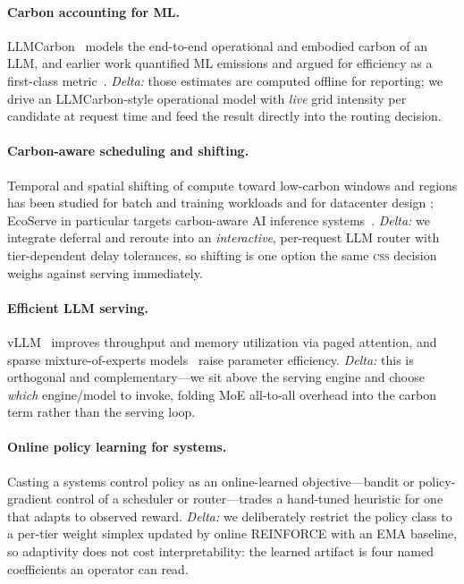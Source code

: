 \documentclass[10pt,twocolumn]{article}
\newcommand{\css}{\textsc{css}}
\begin{document}
\paragraph{Carbon accounting for ML.}
LLMCarbon~\cite{llmcarbon} models the end-to-end operational and embodied
carbon of an LLM, and earlier work quantified ML emissions and argued for
efficiency as a first-class metric~\cite{mlco2,green-ai}. \emph{Delta:} those
estimates are computed offline for reporting; we drive an LLMCarbon-style
operational model with \emph{live} grid intensity per candidate at request time
and feed the result directly into the routing decision.

\paragraph{Carbon-aware scheduling and shifting.}
Temporal and spatial shifting of compute toward low-carbon windows and regions
has been studied for batch and training workloads and for datacenter design
\cite{ecoserve,carbon-explorer,wait-awhile,carbon-aware-k8s}; EcoServe in
particular targets carbon-aware AI inference systems~\cite{ecoserve}.
\emph{Delta:} we integrate deferral and reroute into an \emph{interactive},
per-request LLM router with tier-dependent delay tolerances, so shifting is one
option the same \css{} decision weighs against serving immediately.

\paragraph{Efficient LLM serving.}
vLLM~\cite{vllm} improves throughput and memory utilization via paged
attention, and sparse mixture-of-experts models~\cite{moe} raise parameter
efficiency. \emph{Delta:} this is orthogonal and complementary---we sit above
the serving engine and choose \emph{which} engine/model to invoke, folding MoE
all-to-all overhead into the carbon term rather than the serving loop.

\paragraph{Online policy learning for systems.}
Casting a systems control policy as an online-learned objective---bandit or
policy-gradient control of a scheduler or router---trades a hand-tuned
heuristic for one that adapts to observed reward. \emph{Delta:} we deliberately
restrict the policy class to a per-tier weight simplex updated by online
REINFORCE with an EMA baseline, so adaptivity does not cost interpretability:
the learned artifact is four named coefficients an operator can read.
\end{document}

